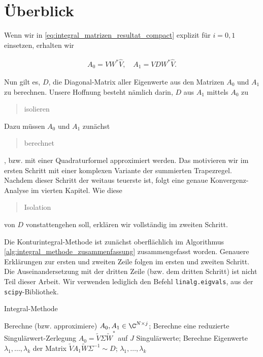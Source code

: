 \section{Überblick}

Wenn wir in \eqref{eq:integral_matrizen_resultat_compact} explizit für $i = 0, 1$ einsetzen, erhalten wir

\begin{align} \label{eq:integral_matrizen_resultat}
    A_0 = V W^\ast \hat V,
    \quad
    A_1 = V D W^\ast \hat V.
\end{align}

Nun gilt es, $D$, die Diagonal-Matrix aller Eigenwerte aus den Matrizen $A_0$ und $A_1$ zu berechnen.
Unsere Hoffnung besteht nämlich darin, $D$ aus $A_1$ mittels $A_0$ zu \blockquote{isolieren}.

Dazu müssen $A_0$ und $A_1$ zunächst \blockquote{berechnet}, bzw. mit einer Quadraturformel approximiert werden.
Das motivieren wir im ersten Schritt mit einer komplexen Variante der summierten Trapezregel.
Nachdem dieser Schritt der weitaus teuerste ist, folgt eine genaue Konvergenz-Analyse im vierten Kapitel.
Wie diese \blockquote{Isolation} von $D$ vonstattengehen soll, erklären wir vollständig im zweiten Schritt.

Die Konturintegral-Methode ist zunächst oberflächlich im Algorithmus \ref{alg:integral_methode_zusammenfassung} zusammengefasst worden.
Genauere Erklärungen zur ersten und zweiten Zeile folgen im ersten und zweiten Schritt.
Die Auseinandersetzung mit der dritten Zeile (bzw. dem dritten Schritt) ist nicht Teil dieser Arbeit.
Wir verwenden lediglich den Befehl \texttt{linalg.eigvals}, aus der \texttt{scipy}-Bibliothek.

\begin{algorithm}[H]
	\caption{Integral-Methode}
    \begin{algorithmic}[0]
          \State Berechne (bzw. approximiere) $A_0, A_1 \in \C^{N \times j}$;
          \State Berechne eine reduzierte Singulärwert-Zerlegung $A_0 = \tilde V \Sigma \tilde W^\ast$ auf $J$ Singulärwerte;
          \State Berechne Eigenwerte $\lambda_1, \dots, \lambda_k$ der Matrix $\tilde V A_1 \tilde W \Sigma^{-1} \sim D$;
          \State \Return $\lambda_1, \dots, \lambda_k$
    \end{algorithmic}
    \label{alg:integral_methode_zusammenfassung}
\end{algorithm}

